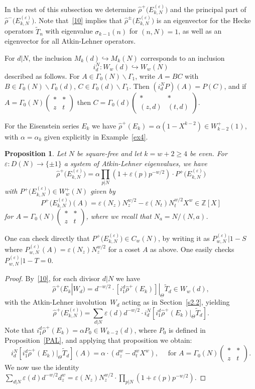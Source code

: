 \documentclass{amsart}
\theoremstyle{plain}
\newtheorem{proposition}[theorem]{Proposition}
\theoremstyle{definition}
\numberwithin{equation}{section}
\newcommand{\Z}{{\mathbb Z}}
\def\e{\varepsilon} \def\DD{\Delta} \def\G{\Gamma}\def\om{\omega}
\def\a{\alpha}\def\b{\beta}\def\g{\gamma}
\def\sm#1#2#3#4{\left(\begin{smallmatrix}#1&#2 \\ #3 & #4 \end{smallmatrix}\right)}
\def\be{\begin{equation}}  \def\ee{\end{equation}}
\newcommand{\wT}{\widetilde{T}}
\renewcommand{\wr}{\widehat{\rho}}
\def\bsh{\backslash}
\def\rar{\rightarrow}\def\FF{\mathbb{F}}
\begin{document}
In the rest of this subsection we determine  $\wr^+ \big(E_{k,N}^{(\e)}\big)$ and 
the principal part of~$\wr^- \big(E_{k,N}^{(\e)}\big)$. Note that~\eqref{10} implies that 
$\wr^{\pm} \big(E_{k,N}^{(\e)}\big)$ is an eigenvector for the Hecke operators
$\wT_n$ with eigenvalue $\sigma_{k-1}(n)$ for $(n,N)=1$, as well as an 
eigenvector for all Atkin-Lehner operators. 

For $d|N$, the inclusion $M_k(d)\hookrightarrow M_k(N)$ corresponds to an
inclusion 
  \[ i_d^N:W_w(d)\hookrightarrow W_w(N) \] 
described as follows. For $A\in \G_0(N)\bsh \G_1$, write $A=BC$ with 
$B\in  \G_0(N)\bsh \G_0(d)$, 
$C\in \G_0(d)\bsh\G_1$. Then $(i_d^N P) (A)=P(C)$, and if $A=\G_0(N) \sm **zt$ 
then $C=\G_0(d)\sm **{(z,d)}{(t,d)}$.

For the Eisenstein series $E_k$ we have 
$ \wr^+(E_k)=\a (1-X^{k-2})\in W_{k-2}^+(1) $, with $\a=\a_k$ given explicitly in
Example~\ref{ex4}. 
\begin{proposition}\label{C1}
Let $N$ be square-free and let $k=w+2\ge 4$ be even.
For $\e:D(N)\rar\{\pm 1\}$ a system of Atkin-Lehner eigenvalues, 
we have 
\[
\wr^+ \big(E_{k,N}^{(\e)}\big)=\a \prod_{p|N}(1+\e(p)p^{-w/2})\cdot 
P^+\big(E_{k,N}^{(\e)}\big) 
\]
with $P^+\big(E_{k,N}^{(\e)}\big)\in W_{w}^+(N)$ given by
\[
P^+\big(E_{k,N}^{(\e)}\big)(A)=\e(N_z)N_z^{w/2}-\e(N_t)N_t^{w/2} X^w\in \Z[X]
\]
for $A=\G_0(N)\sm **zt$, where we recall that $N_a=N/(N,a)$.  
\end{proposition}
One can check directly that $P^+\big(E_{k,N}^{(\e)}\big)\in C_w(N)$, by writing it as 
$P_{w,N}^{(\e)}|1-S$ where   
$P_{w,N}^{(\e)}(A)=\e(N_z)N_z^{w/2}$ for a coset $A$ as above. One easily checks
$P_{w,N}^{(\e)}|1-T=0$.
\begin{proof} By~\eqref{10}, for each divisor $d|N$ we have
\[ \wr^+ (E_k|W_d)=d^{-w/2}\cdot [i_1^d\wr^+ (E_k) ]|_\Theta \wT_d \in W_w(d),\]
with the Atkin-Lehner involution~$W_d$ acting as in Section~\ref{s2.2}, yielding
\be\label{2.9}
\wr^+ \big(E_{k,N}^{(\e)}\big)= \sum_{d|N}\e(d)d^{-w/2} \cdot
i_d^N [i_1^d\wr^+ (E_k) |_\Theta \wT_d].
\ee
Note that $i_1^d \wr^+(E_k)=\a P_0   \in W_{k-2}(d)$, where 
$P_0$ is defined in Proposition~\ref{PAL}, and applying that proposition
we obtain: 
\[i_d^N [i_1^d\wr^+ (E_k) |_\Theta \wT_d](A)=\a\cdot (d_z^w-d_t^w X^w), 
\quad \text{ for } A=\G_0(N)\sm **zt .
\]
We now use the identity 
$ \sum_{d|N}\e(d)d^{-w/2} d_z^w = 
\e(N_z) N_z^{w/2}\cdot\prod_{p|N}(1+\e(p)p^{-w/2}) $.
\end{proof}
\end{document}
